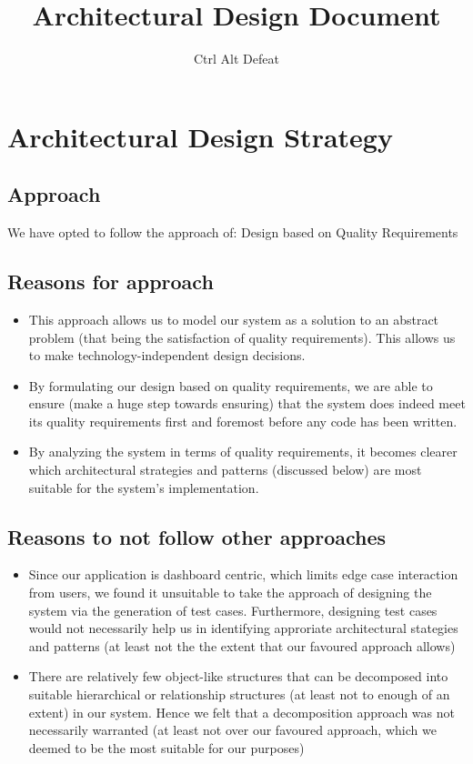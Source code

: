 \documentclass[12pt]{article}
\title{Architectural Design Document}
\author{Ctrl Alt Defeat}
\begin{document}

\tableofcontents
\newpage
\section{Architectural Design Strategy}
\subsection{Approach}
We have opted to follow the approach of: Design based on Quality Requirements
\subsection{Reasons for approach}
\begin{itemize}
    \item This approach allows us to model our system as a solution to an abstract problem (that being the satisfaction of quality requirements). This allows us to  make technology-independent design decisions.
    \item By formulating our design based on quality requirements, we are able to ensure (make a huge step towards ensuring) that the system does indeed meet its quality requirements first and foremost before any code has been written.
    \item By analyzing the system in terms of quality requirements, it becomes clearer which architectural strategies and patterns (discussed below) are most suitable for the system's implementation.
\end{itemize}
\subsection{Reasons to not follow other approaches}
\begin{itemize}
    \item Since our application is dashboard centric, which limits edge case interaction from users, we found it unsuitable to take the approach of designing the system via the generation of test cases. Furthermore, designing test cases would not necessarily help us in identifying approriate architectural stategies and patterns (at least not the the extent that our favoured approach allows)
    \item There are relatively few object-like structures that can be decomposed into suitable hierarchical or relationship structures (at least not to enough of an extent) in our system. Hence we felt that a decomposition approach was not necessarily warranted (at least not over our favoured approach, which we deemed to be the most suitable for our purposes)
\end{itemize}
\end{document}
